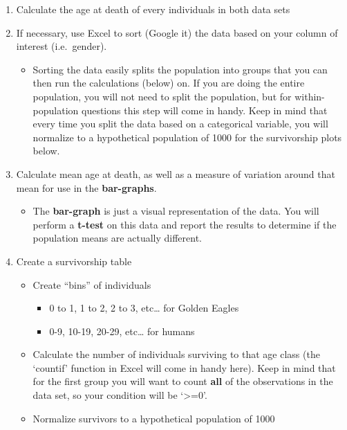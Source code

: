 \documentclass[]{krantz}
\providecommand{\tightlist}{%
  \setlength{\itemsep}{0pt}\setlength{\parskip}{0pt}}
\theoremstyle{definition}
\theoremstyle{definition}
\theoremstyle{definition}
\theoremstyle{remark}
\begin{document}
\begin{enumerate}
\def\labelenumi{\arabic{enumi}.}
\tightlist
\item
  Calculate the age at death of every individuals in both data sets
\item
  If necessary, use Excel to sort (Google it) the data based on your
  column of interest (i.e.~gender).

  \begin{itemize}
  \tightlist
  \item
    Sorting the data easily splits the population into groups that you
    can then run the calculations (below) on. If you are doing the
    entire population, you will not need to split the population, but
    for within-population questions this step will come in handy. Keep
    in mind that every time you split the data based on a categorical
    variable, you will normalize to a hypothetical population of 1000
    for the survivorship plots below.
  \end{itemize}
\item
  Calculate mean age at death, as well as a measure of variation around
  that mean for use in the \textbf{bar-graphs}.

  \begin{itemize}
  \tightlist
  \item
    The \textbf{bar-graph} is just a visual representation of the data.
    You will perform a \textbf{t-test} on this data and report the
    results to determine if the population means are actually different.
  \end{itemize}
\item
  Create a survivorship table

  \begin{itemize}
  \tightlist
  \item
    Create ``bins'' of individuals

    \begin{itemize}
    \tightlist
    \item
      0 to 1, 1 to 2, 2 to 3, etc\ldots{} for Golden Eagles
    \item
      0-9, 10-19, 20-29, etc\ldots{} for humans
    \end{itemize}
  \item
    Calculate the number of individuals surviving to that age class (the
    `countif' function in Excel will come in handy here). Keep in mind
    that for the first group you will want to count \textbf{all} of the
    observations in the data set, so your condition will be
    `\textgreater{}=0'.
  \item
    Normalize survivors to a hypothetical population of 1000


\end{itemize}
\end{enumerate}
\end{document}
